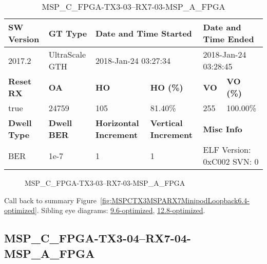 \begin{table}[h]
\centering
\caption{MSP\_C\_FPGA-TX3-03--RX7-03-MSP\_A\_FPGA}
\label{tab:MSPCFPGATX303RX703MSPAFPGA6.4-optimized}
\begin{tabular}{@{}|l|l|l|l|l|l|@{}}
\toprule
\textbf{SW Version}                & \textbf{GT Type}   & \multicolumn{2}{l|}{\textbf{Date and Time Started}}            & \multicolumn{2}{l|}{\textbf{Date and Time Ended}}        \\ \midrule
2017.2                       & UltraScale GTH          & \multicolumn{2}{l|}{2018-Jan-24 03:27:34}                   & \multicolumn{2}{l|}{2018-Jan-24 03:28:45}               \\ \midrule
\textbf{Reset RX}                  & \textbf{OA} & \textbf{HO}   & \textbf{HO (\%)} & \textbf{VO} & \textbf{VO (\%)} \\ \midrule
true & 24759        & 105          & 81.40\%        & 255        & 100.00\%       \\ \midrule
\textbf{Dwell Type}                & \textbf{Dwell BER} & \textbf{Horizontal Increment} & \textbf{Vertical Increment}    & \multicolumn{2}{l|}{\textbf{Misc Info}}                  \\ \midrule
BER                            & 1e-7        & 1        & 1           & \multicolumn{2}{l|}{ELF Version: 0xC002 SVN: 0}                         \\ \bottomrule
\end{tabular}
\end{table}

\begin{figure}[h]
\caption{MSP\_C\_FPGA-TX3-03--RX7-03-MSP\_A\_FPGA} \label{fig:MSPCFPGATX303RX703MSPAFPGA6.4-optimized}
\end{figure}

Call back to summary Figure~\ref{fig:MSPCTX3MSPARX7MinipodLoopback6.4-optimized}.
Sibling eye diagrams: \hyperref[sec:MSPCFPGATX303RX703MSPAFPGA9.6-optimized]{9.6-optimized}, \hyperref[sec:MSPCFPGATX303RX703MSPAFPGA12.8-optimized]{12.8-optimized}.

\clearpage
\newpage


\subsection{MSP\_C\_FPGA-TX3-04--RX7-04-MSP\_A\_FPGA}\label{sec:MSPCFPGATX304RX704MSPAFPGA6.4-optimized}

